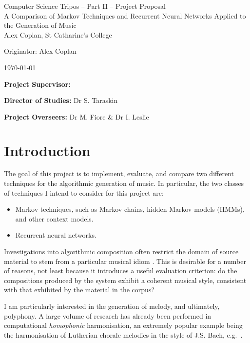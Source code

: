 \documentclass[12pt,a4paper,twoside]{article}
\begin{document}
\cleanlookdateon

\begin{center}
\Large
Computer Science Tripos -- Part II -- Project Proposal\\[4mm]
\LARGE
A Comparison of Markov Techniques and Recurrent Neural Networks Applied to the Generation of Music\\[4mm]

\large
Alex Coplan, St Catharine's College

Originator: Alex Coplan

\today
\end{center}

\vspace{5mm}

\textbf{Project Supervisor:} 

\textbf{Director of Studies:} Dr S. Taraskin

\textbf{Project Overseers:} Dr M. Fiore \& Dr I. Leslie


\section*{Introduction}

The goal of this project is to implement, evaluate, and compare two different techniques for the algorithmic generation of music. In particular, the two classes of techniques I intend to consider for this project are:
\begin{itemize}[itemsep=0mm]
	\item Markov techniques, such as Markov chains, hidden Markov models (HMMs), and other context models.
	\item Recurrent neural networks.
\end{itemize}

Investigations into algorithmic composition often restrict the domain of source material to stem from a particular musical idiom \cite{pearce2001evaluation}. This is desirable for a number of reasons, not least because it introduces a useful evaluation criterion: do the compositions produced by the system exhibit a coherent musical style, consistent with that exhibited by the material in the corpus?

I am particularly interested in the generation of melody, and ultimately, polyphony. A large volume of research has already been performed in computational \emph{homophonic} harmonisation, an extremely popular example being the harmonisation of Lutherian chorale melodies in the style of J.S. Bach, e.g.\ \cite{allan2005chorales}\cite{phon2002computational}\cite{phon1999four}\cite{whorley2015improved}.
\end{document}
